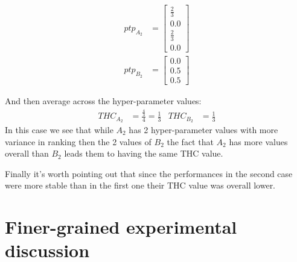 \documentclass[10pt]{article} %
\begin{document}
\begin{enumerate}
\begin{equation*}
\begin{aligned}
        ptp_{A_2} &= \begin{bmatrix}
                    \frac{2}{3} \\
                    0.0 \\
                    \frac{2}{3} \\
                    0.0
                    \end{bmatrix} \\
        ptp_{B_2} &= \begin{bmatrix}
                    0.0\\
                    0.5\\
                    0.5
                    \end{bmatrix}
    \end{aligned}
\end{equation*}

    And then average across the hyper-parameter values:
        \begin{align}
            THC_{A_2} &= \frac{\frac{4}{3}}{4} = \frac{1}{3} & THC_{B_2} &= \frac{1}{3}
        \end{align}
    In this case we see that while $A_2$ has 2 hyper-parameter values with more variance in ranking then the 2 values of $B_2$ the fact that $A_2$ has more values overall than $B_2$ leads them to having the same THC value.
\end{enumerate}

Finally it's worth pointing out that since the performances in the second case were more stable than in the first one their THC value was overall lower. 

\section{Finer-grained experimental discussion}
\label{sec:finerGrainedExperiments}
\end{document}
